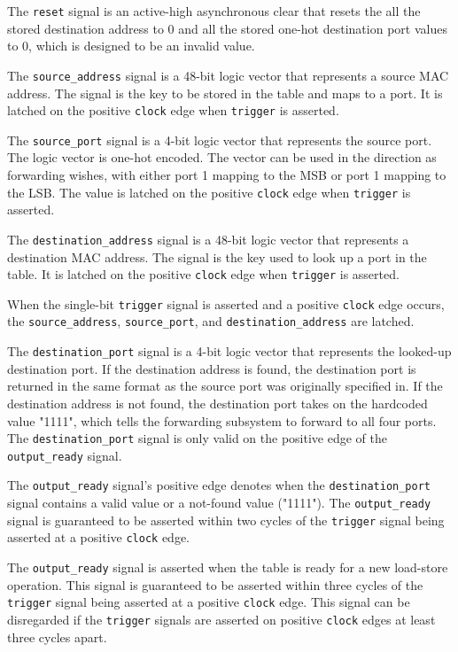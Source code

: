 \documentclass{article}
\begin{document}
The \texttt{reset} signal is an active-high asynchronous clear that resets the all the stored destination address to 0 and all the stored one-hot destination port values to 0, which is designed to be an invalid value. 

The \texttt{source\_address} signal is a 48-bit logic vector that represents a source MAC address. The signal is the key to be stored in the table and maps to a port. It is latched on the positive \texttt{clock} edge when \texttt{trigger} is asserted.

The \texttt{source\_port} signal is a 4-bit logic vector that represents the source port. The logic vector is one-hot encoded. The vector can be used in the direction as forwarding wishes, with either port 1 mapping to the MSB or port 1 mapping to the LSB. The value is latched on the positive \texttt{clock} edge when \texttt{trigger} is asserted.

The \texttt{destination\_address} signal is a 48-bit logic vector that represents a destination MAC address. The signal is the key used to look up a port in the table. It is latched on the positive \texttt{clock} edge when \texttt{trigger} is asserted.

When the single-bit \texttt{trigger} signal is asserted and a positive \texttt{clock} edge occurs, the \texttt{source\_address}, \texttt{source\_port}, and \texttt{destination\_address} are latched. 

The \texttt{destination\_port} signal is a 4-bit logic vector that represents the looked-up destination port. If the destination address is found, the destination port is returned in the same format as the source port was originally specified in. If the destination address is not found, the destination port takes on the hardcoded value "1111", which tells the forwarding subsystem to forward to all four ports. The \texttt{destination\_port} signal is only valid on the positive edge of the \texttt{output\_ready} signal.

The \texttt{output\_ready} signal's positive edge denotes when the \texttt{destination\_port} signal contains a valid value or a not-found value ("1111"). The \texttt{output\_ready} signal is guaranteed to be asserted within two cycles of the \texttt{trigger} signal being asserted at a positive \texttt{clock} edge. 

The \texttt{output\_ready} signal is asserted when the table is ready for a new load-store operation. This signal is guaranteed to be asserted within three cycles of the \texttt{trigger} signal being asserted at a positive \texttt{clock} edge. This signal can be disregarded if the \texttt{trigger} signals are asserted on positive \texttt{clock} edges at least three cycles apart. 
\end{document}
